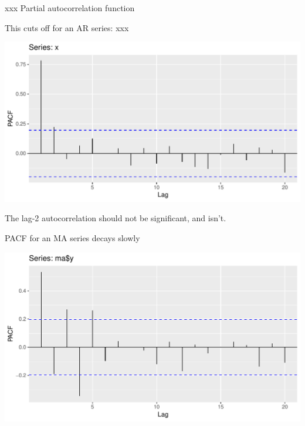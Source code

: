 \documentclass[ignorenonframetext,]{beamer}
\newenvironment{Shaded}{\begin{snugshade}}{\end{snugshade}}
\newcommand{\DataTypeTok}[1]{\textcolor[rgb]{0.13,0.29,0.53}{#1}}
\newcommand{\KeywordTok}[1]{\textcolor[rgb]{0.13,0.29,0.53}{\textbf{#1}}}
\newcommand{\NormalTok}[1]{#1}
\newcommand{\OperatorTok}[1]{\textcolor[rgb]{0.81,0.36,0.00}{\textbf{#1}}}
\newcommand{\StringTok}[1]{\textcolor[rgb]{0.31,0.60,0.02}{#1}}
\begin{document}
\begin{frame}[fragile]{xxx Partial autocorrelation function}
\protect\hypertarget{xxx-partial-autocorrelation-function}{}

This cuts off for an AR series: xxx

\begin{Shaded}
\end{Shaded}

\includegraphics{figure/unnamed-chunk-46-1.pdf}

The lag-2 autocorrelation should not be significant, and isn't.

\end{frame}

\begin{frame}[fragile]{PACF for an MA series decays slowly}
\protect\hypertarget{pacf-for-an-ma-series-decays-slowly}{}

\begin{Shaded}
\end{Shaded}

\includegraphics{figure/unnamed-chunk-47-1.pdf}

\end{frame}
\end{document}
